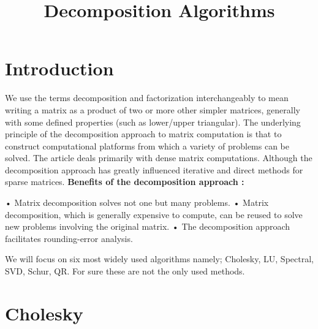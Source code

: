 \documentclass[]{finalproject}
\title{Decomposition Algorithms}
\begin{document}
\maketitle

\section{Introduction} \label{introduction}

\begin{flushleft}

We use the terms decomposition and factorization interchangeably to mean writing a matrix as a product of two or more other simpler matrices, generally with some defined properties (such as lower/upper triangular). \newline
The underlying principle of the decomposition approach to matrix computation is that to construct computational platforms from which a variety of problems can be solved.
The article deals primarily with dense matrix computations. Although the decomposition approach has greatly influenced iterative and direct methods for sparse matrices. \newline \newline
\textbf{Benefits of the decomposition approach :} 
\begin{flushleft}
• Matrix decomposition solves not one but many problems. \newline
• Matrix decomposition, which is generally expensive to compute, can be reused to solve new problems involving the original matrix.\newline
• The decomposition approach facilitates rounding-error analysis.\newline
\end{flushleft}
We will focus on six most widely used  algorithms namely; Cholesky, LU, Spectral, SVD, Schur, QR. For sure these are not the only used methods.

\end{flushleft}


\section{Cholesky} \label{cholesky}
\end{document}
